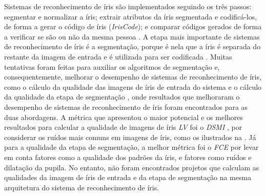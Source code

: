 \par Sistemas de reconhecimento de íris são implementados seguindo os três passos: segmentar e normalizar a íris; extrair atributos da íris segmentada e codificá-los, de forma a gerar o código de íris (\textit{IrisCode}); e comparar códigos gerados de forma a verificar se são ou não da mesma pessoa \cite{wayman2005biometric}. A etapa mais importante de sistemas de reconhecimento de íris é a segmentação, porque é nela que a íris é separada do restante da imagem de entrada e é utilizada para ser codificada \cite{daugman2004}. Muitas tentativas foram feitas para auxiliar os algoritmos de segmentação e, consequentemente, melhorar o desempenho de sistemas de reconhecimento de íris, como o cálculo da qualidade das imagens de íris de entrada do sistema \cite{daugman2004, starovoitov2013-DSMI-45, Jenadeleh_2018_CVPR_Workshops, wan2007-DSMI-50, bergmller2017-DSMI-2, chen2013-DSMI-4, kalka2010-DSMI-18, li2011} e o cálculo da qualidade da etapa de segmentação \cite{proenca2011, du2010, belcher2008, mottalli2009-DSMI-30, ma2003-FIM-7}, onde resultados que melhoraram o desempenho de sistemas de reconhecimento de íris foram encontrados para as duas abordagens. A métrica que apresentou o maior potencial e os melhores resultados para calcular a qualidade de imagens de íris \textit{\acrshort{LV}} foi o \textit{\acrfull{DSMI}} \cite{Jenadeleh_2018_CVPR_Workshops}, por considerar os ruídos mais comuns em imagens de íris, como os ilustrados na . Já para a qualidade da etapa de segmentação, a melhor métrica foi o \textit{\acrfull{FCE}} \cite{du2010} por levar em conta fatores como a qualidade dos padrões da íris, e fatores como ruídos e dilatação da pupila. No entanto, não foram encontrados projetos que calculam as qualidades da imagem de íris de entrada e da etapa de segmentação na mesma arquitetura do sistema de reconhecimento de íris.

